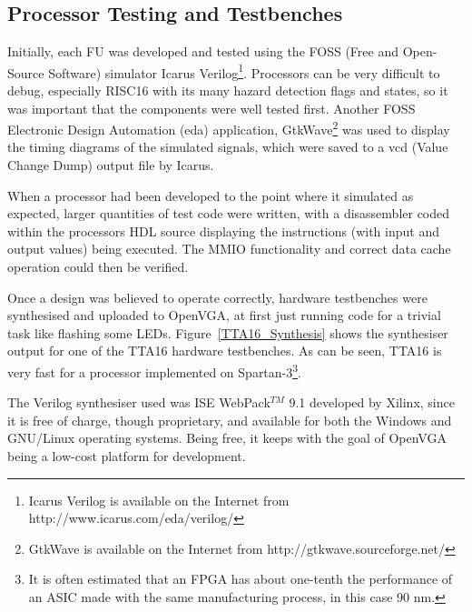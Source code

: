 \subsection{Processor Testing and Testbenches}
Initially, each FU was developed and tested using the FOSS (Free and Open-Source
Software) simulator Icarus Verilog\footnote{Icarus Verilog is available on the
Internet from http://www.icarus.com/eda/verilog/}. Processors can be very
difficult to debug, especially RISC16 with its many hazard detection flags and
states, so it was important that the components were well tested first. Another
FOSS Electronic Design Automation (\gls{eda}) application, GtkWave\footnote{GtkWave is available on
the Internet from http://gtkwave.sourceforge.net/} was used to display the timing
diagrams of the simulated signals, which were saved to a \gls{vcd} (Value Change Dump) output file by Icarus.

When a processor had been developed to the point where it simulated as expected,
larger quantities of test code were written, with a disassembler coded within
the processors HDL source displaying the instructions (with input and output
values) being executed. The MMIO functionality and correct data cache operation
could then be verified.

Once a design was believed to operate correctly, hardware testbenches were
synthesised and uploaded to OpenVGA, at first just running code for a trivial
task like flashing some LEDs. Figure~\ref{TTA16_Synthesis} shows the synthesiser
output for one of the TTA16 hardware testbenches. As can be seen, TTA16 is very
fast for a processor implemented on Spartan-3\footnote{It is often estimated that
an FPGA has about one-tenth the performance of an ASIC made with the same
manufacturing process, in this case 90 nm.}.

The Verilog synthesiser used was ISE WebPack$^{TM}$ 9.1 developed by Xilinx,
since it is free of charge, though proprietary, and available for both the Windows and
GNU/Linux operating systems. Being free, it keeps with the goal of OpenVGA being
a low-cost platform for development.


